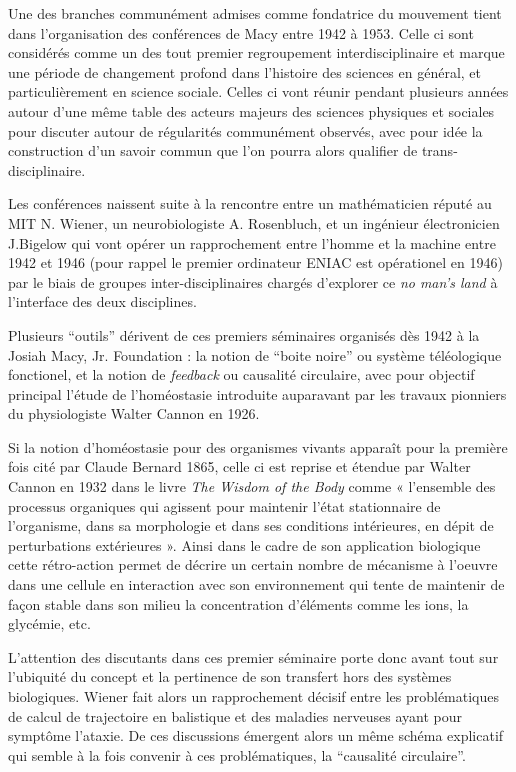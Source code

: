 Une des branches communément admises comme fondatrice du mouvement tient dans l'organisation des conférences de Macy entre 1942 à 1953. Celle ci sont considérés comme un des tout premier regroupement interdisciplinaire et marque une période de changement profond dans l'histoire des sciences en général, et particulièrement en science sociale. Celles ci vont réunir pendant plusieurs années autour d'une même table des acteurs majeurs des sciences physiques et sociales pour discuter autour de régularités communément observés, avec pour idée la construction d'un savoir commun que l'on pourra alors qualifier de trans-disciplinaire.

Les conférences naissent suite à la rencontre entre un mathématicien réputé au MIT N. Wiener, un neurobiologiste A. Rosenbluch, et un ingénieur électronicien J.Bigelow qui vont opérer un rapprochement entre l'homme et la machine entre 1942 et 1946 (pour rappel le premier ordinateur ENIAC est opérationel en 1946) par le biais de groupes inter-disciplinaires chargés d'explorer ce \textit{no man's land} à l'interface des deux disciplines.

Plusieurs \enquote{outils} dérivent de ces premiers séminaires organisés dès 1942 à la Josiah Macy, Jr. Foundation : la notion de \enquote{boite noire} ou système téléologique fonctionel, et la notion de \textit{feedback} ou causalité circulaire, avec pour objectif principal l'étude de l'homéostasie introduite auparavant par les travaux pionniers du physiologiste Walter Cannon en 1926.

Si la notion d'homéostasie pour des organismes vivants apparaît pour la première fois cité par Claude Bernard 1865, celle ci est reprise et étendue par Walter Cannon en 1932 dans le livre \textit{The Wisdom of the Body} \autocite{Cannon1932} comme « l’ensemble des processus organiques qui agissent pour maintenir l’état stationnaire de l’organisme, dans sa morphologie et dans ses conditions intérieures, en dépit de perturbations extérieures ». Ainsi dans le cadre de son application biologique cette rétro-action permet de décrire un certain nombre de mécanisme à l'oeuvre dans une cellule en interaction avec son environnement qui tente de maintenir de façon stable dans son milieu la concentration d'éléments comme les ions, la glycémie, etc.

L'attention des discutants dans ces premier séminaire porte donc avant tout sur l'ubiquité du concept et la pertinence de son transfert hors des systèmes biologiques. Wiener fait alors un rapprochement décisif entre les problématiques de calcul de trajectoire en balistique et des maladies nerveuses ayant pour symptôme l'ataxie. De ces discussions émergent alors un même schéma explicatif qui semble à la fois convenir à ces problématiques, la \enquote{causalité circulaire}. \autocite[774]{Pouvreau2013, Rosnay1975}

